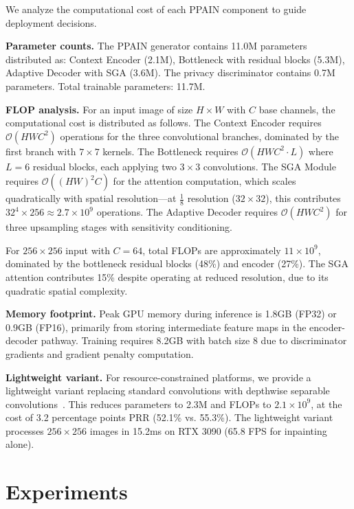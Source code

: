 \documentclass[preprint,12pt]{elsarticle}
\begin{document}
We analyze the computational cost of each PPAIN component to guide deployment decisions.

\textbf{Parameter counts.} The PPAIN generator contains 11.0M parameters distributed as: Context Encoder (2.1M), Bottleneck with residual blocks (5.3M), Adaptive Decoder with SGA (3.6M). The privacy discriminator contains 0.7M parameters. Total trainable parameters: 11.7M.

\textbf{FLOP analysis.} For an input image of size $H \times W$ with $C$ base channels, the computational cost is distributed as follows. The Context Encoder requires $\mathcal{O}(HWC^2)$ operations for the three convolutional branches, dominated by the first branch with $7 \times 7$ kernels. The Bottleneck requires $\mathcal{O}(HWC^2 \cdot L)$ where $L=6$ residual blocks, each applying two $3 \times 3$ convolutions. The SGA Module requires $\mathcal{O}((HW)^2 C)$ for the attention computation, which scales quadratically with spatial resolution---at $\frac{1}{8}$ resolution ($32 \times 32$), this contributes $32^4 \times 256 \approx 2.7 \times 10^9$ operations. The Adaptive Decoder requires $\mathcal{O}(HWC^2)$ for three upsampling stages with sensitivity conditioning.

For $256 \times 256$ input with $C=64$, total FLOPs are approximately $11 \times 10^9$, dominated by the bottleneck residual blocks (48\%) and encoder (27\%). The SGA attention contributes 15\% despite operating at reduced resolution, due to its quadratic spatial complexity.

\textbf{Memory footprint.} Peak GPU memory during inference is 1.8GB (FP32) or 0.9GB (FP16), primarily from storing intermediate feature maps in the encoder-decoder pathway. Training requires 8.2GB with batch size 8 due to discriminator gradients and gradient penalty computation.

\textbf{Lightweight variant.} For resource-constrained platforms, we provide a lightweight variant replacing standard convolutions with depthwise separable convolutions~\cite{howard2019searching}. This reduces parameters to 2.3M and FLOPs to $2.1 \times 10^9$, at the cost of 3.2 percentage points PRR (52.1\% vs. 55.3\%). The lightweight variant processes $256 \times 256$ images in 15.2ms on RTX 3090 (65.8 FPS for inpainting alone).


\section{Experiments}
\label{sec:experiments}
\end{document}
